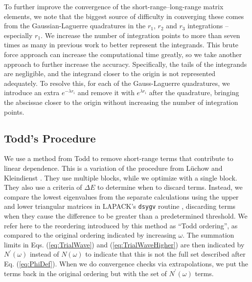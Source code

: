 \documentclass[preprint,showpacs,showkeys,preprintnumbers,amsmath,amssymb,longbibliography,pra,aps]{revtex4-1}
\begin{document}
To further improve the convergence of the short-range--long-range matrix 
elements, we note that the biggest source of difficulty in converging these 
comes from the Gaussian-Laguerre quadratures in the $r_1$, $r_2$ and $r_3$ 
integrations -- especially $r_1$. We increase the number of integration 
points to more than seven times as many in previous work
\cite{VanReeth2003,VanReeth2004} to better represent the integrands. This
brute force approach 
can increase the computational time greatly, so we take another approach to 
further increase the accuracy. Specifically, the tails of the integrands are 
negligible, and the integrand closer to the origin is not represented 
adequately. To resolve this, for each of the Gauss-Laguerre quadratures, we 
introduce an extra $e^{-\lambda r_i}$ and remove it with $e^{\lambda r_i}$ 
after the quadrature, bringing the abscissae closer to the origin without 
increasing the number of integration points.

\subsection{Todd's Procedure}
\label{sec:Todd}
We use a method from Todd \cite{Todd2007} to remove short-range terms that 
contribute to linear dependence. This is a variation of the procedure from
L\"uchow and Kleindienst \cite{Luchow1992}. They use multiple blocks, while we 
optimize with a single block. They also use a criteria of $\Delta E$ to 
determine when to discard terms. Instead, we compare the lowest eigenvalues 
from the separate calculations using the upper and lower triangular matrices 
in LAPACK's \texttt{dsygv} routine \cite{LAPACK}, discarding terms when they 
cause the difference to be greater than a predetermined threshold. We refer 
here to the reordering introduced by this method as ``Todd ordering'', as 
compared to the original ordering indicated by increasing $\omega$. The 
summation limits in Eqs. (\ref{eq:TrialWave}) and (\ref{eq:TrialWaveHigher}) 
are then indicated by $N^\prime(\omega)$ instead of $N(\omega)$ to indicate 
that this is not the full set described after Eq. (\ref{eq:PhiDef}). When we 
do convergence checks via extrapolations, we put the terms back in the 
original ordering but with the set of $N^\prime(\omega)$ terms.
\end{document}
